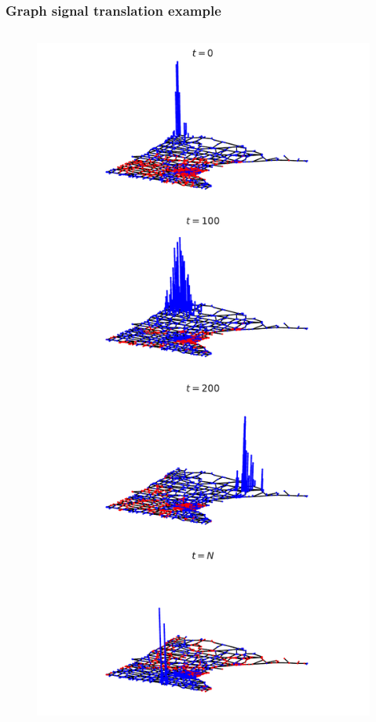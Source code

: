\documentclass{beamer}
\begin{document}
\begin{frame}
  \frametitle{Graph signal translation example}
  \begin{columns}
    \begin{column}{0.5\textwidth}
\begin{figure}
\includegraphics[trim={0 16cm 0 0},clip,width=\linewidth]{../img/basic_operations_0.pdf}

\end{figure}
\end{column}
\end{columns}
\end{frame}
\end{document}
